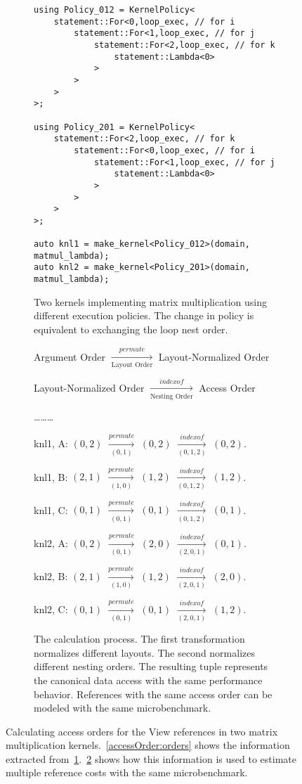 \begin{figure*}
\begin{subfigure}[b]{0.40\textwidth}
\begin{lstlisting}
using Policy_012 = KernelPolicy< 
	statement::For<0,loop_exec, // for i
		statement::For<1,loop_exec, // for j
			statement::For<2,loop_exec, // for k
				statement::Lambda<0>
			>
		>
	>
>;

using Policy_201 = KernelPolicy< 
	statement::For<2,loop_exec, // for k
		statement::For<0,loop_exec, // for i
			statement::For<1,loop_exec, // for j
				statement::Lambda<0>
			>
		>
	>
>;

auto knl1 = make_kernel<Policy_012>(domain, matmul_lambda);
auto knl2 = make_kernel<Policy_201>(domain, matmul_lambda);
		\end{lstlisting}
		\caption{Two kernels implementing matrix multiplication using different execution policies. The change in policy is equivalent to exchanging the loop nest order.}\label{accessOrder:code}
	\end{subfigure}
	\hspace{0.02\textwidth}
	\begin{subfigure}[b]{0.45\textwidth}
		\begin{center}
		Argument Order $\xrightarrow[\text{Layout Order}]{permute}$ Layout-Normalized Order

		Layout-Normalized Order $\xrightarrow[\text{Nesting Order}]{indexof}$ Access Order

		\vspace{5px}
		\dots\dots\dots
		\vspace{5px}

		knl1, A: $(0,2)$ $\xrightarrow[(0,1)]{permute}$ $(0,2)$ $\xrightarrow[(0,1,2)]{indexof}$ $(0,2)$.
		
		knl1, B: $(2,1)$ $\xrightarrow[(1,0)]{permute}$ $(1,2)$ $\xrightarrow[(0,1,2)]{indexof}$ $(1,2)$.
		
		knl1, C: $(0,1)$ $\xrightarrow[(0,1)]{permute}$ $(0,1)$ $\xrightarrow[(0,1,2)]{indexof}$ $(0,1)$.
		
		knl2, A: $(0,2)$ $\xrightarrow[(0,1)]{permute}$ $(2,0)$ $\xrightarrow[(2,0,1)]{indexof}$ $(0,1)$.

		knl2, B: $(2,1)$ $\xrightarrow[(1,0)]{permute}$ $(1,2)$ $\xrightarrow[(2,0,1)]{indexof}$ $(2,0)$.

		knl2, C: $(0,1)$ $\xrightarrow[(0,1)]{permute}$ $(0,1)$ $\xrightarrow[(2,0,1)]{indexof}$ $(1,2)$.
	\end{center}
	\caption{The calculation process. The first transformation normalizes different layouts. The second normalizes different nesting orders. The resulting tuple represents the canonical data access with the same performance behavior. References with the same access order can be modeled with the same microbenchmark.}\label{accessOrder:calc}
	\end{subfigure}

	
	\caption{Calculating access orders for the View references in two matrix multiplication kernels.~\ref{accessOrder:orders} shows the information extracted from~\ref{accessOrder:code}.~\ref{accessOrder:calc} shows how this information is used to estimate multiple reference costs with the same microbenchmark. }\label{accessOrder}

\end{figure*}


